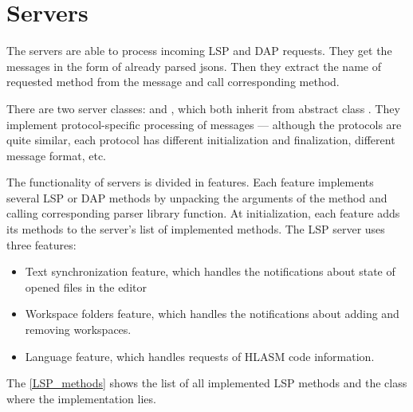 \section{Servers}
The servers are able to process incoming LSP and DAP requests. They get the messages in the form of already parsed jsons. Then they extract the name of requested method from the message and call corresponding method.

There are two server classes:  and , which both inherit from abstract class . They implement protocol-specific processing of messages --- although the protocols are quite similar, each protocol has different initialization and finalization, different message format, etc.

The functionality of servers is divided in features. Each feature implements several LSP or DAP methods by unpacking the arguments of the method and calling corresponding parser library function. At initialization, each feature adds its methods to the server's list of implemented methods. The LSP server uses three features:
\begin{itemize}
	\item Text synchronization feature, which handles the notifications about state of opened files in the editor
	\item Workspace folders feature, which handles the notifications about adding and removing workspaces.
	\item Language feature, which handles requests of HLASM code information.
\end{itemize}
The \cref{LSP_methods} shows the list of all implemented LSP methods and the class where the implementation lies.

